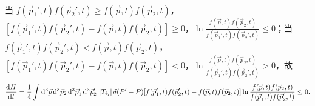 \documentclass{assignment}
\begin{document}
\begin{pf}
\begin{align}
    \end{align}
    当 $f(\vec{p}_1',t)f(\vec{p}_2',t)\geq f(\vec{p},t)f(\vec{p}_2,t)$，$[f(\vec{p}_1',t)f(\vec{p}_2',t)-f(\vec{p},t)f(\vec{p}_2,t)]\geq 0$，$\ln\frac{f(\vec{p},t)f(\vec{p}_2,t)}{f(\vec{p}_1',t)f(\vec{p}_2',t)}\leq 0$；当 $f(\vec{p}_1',t)f(\vec{p}_2',t)<f(\vec{p},t)f(\vec{p}_2,t)$，$[f(\vec{p}_1',t)f(\vec{p}_2',t)-f(\vec{p},t)f(\vec{p}_2,t)]<0$，$\ln\frac{f(\vec{p},t)f(\vec{p}_2,t)}{f(\vec{p}_1',t)f(\vec{p}_2',t)}>0$，故
    \begin{align}
        \frac{\mathrm{d}H}{\mathrm{d}t}=\frac{1}{4}\int\mathrm{d}^3\vec{p}\,\mathrm{d}^3\vec{p}_2\,\mathrm{d}^3\vec{p}_1'\,\mathrm{d}^3\vec{p}_2'\,\left\lvert T_{ij}\right\rvert\delta(P'-P)[f(\vec{p}_1',t)f(\vec{p}_2',t)-f(\vec{p},t)f(\vec{p}_2,t)]\ln\frac{f(\vec{p},t)f(\vec{p}_2,t)}{f(\vec{p}_1',t)f(\vec{p}_2',t)}\leq 0.
    \end{align}
\end{pf}
\end{document}
